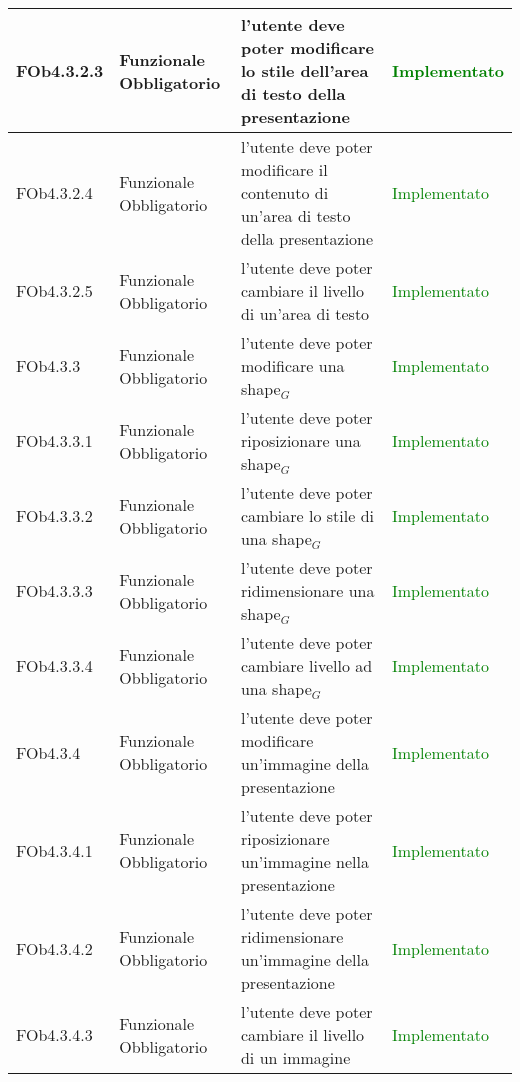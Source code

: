 \begin{longtable}{|l|p{2.5cm}|p{5cm}|p{3.5cm}|}
\hline
FOb4.3.2.3 & Funzionale \linebreak Obbligatorio & l'utente deve poter modificare lo stile dell'area di testo della presentazione & \textcolor{green}{Implementato}  \\
\hline
FOb4.3.2.4 & Funzionale \linebreak Obbligatorio & l'utente deve poter modificare il contenuto di un'area di testo della presentazione & \textcolor{green}{Implementato}  \\
\hline
FOb4.3.2.5 & Funzionale \linebreak Obbligatorio & l'utente deve poter cambiare il livello di un'area di testo & \textcolor{green}{Implementato}  \\
\hline
FOb4.3.3 & Funzionale \linebreak Obbligatorio & l'utente deve poter modificare una shape$_G$ & \textcolor{green}{Implementato}  \\
\hline
FOb4.3.3.1 & Funzionale \linebreak Obbligatorio & l'utente deve poter riposizionare una shape$_G$ & \textcolor{green}{Implementato}  \\
\hline
FOb4.3.3.2 & Funzionale \linebreak Obbligatorio & l'utente deve poter cambiare lo stile di una shape$_G$ & \textcolor{green}{Implementato}  \\
\hline
FOb4.3.3.3 & Funzionale \linebreak Obbligatorio & l'utente deve poter ridimensionare una shape$_G$ & \textcolor{green}{Implementato}  \\
\hline
FOb4.3.3.4 & Funzionale \linebreak Obbligatorio & l'utente deve poter cambiare livello ad una shape$_G$ & \textcolor{green}{Implementato}  \\
\hline
FOb4.3.4 & Funzionale \linebreak Obbligatorio & l'utente deve poter modificare un'immagine della presentazione & \textcolor{green}{Implementato}  \\
\hline
FOb4.3.4.1 & Funzionale \linebreak Obbligatorio & l'utente deve poter riposizionare un'immagine nella presentazione & \textcolor{green}{Implementato}  \\
\hline
FOb4.3.4.2 & Funzionale \linebreak Obbligatorio & l'utente deve poter ridimensionare un'immagine della presentazione & \textcolor{green}{Implementato}  \\
\hline
FOb4.3.4.3 & Funzionale \linebreak Obbligatorio & l'utente deve poter cambiare il livello di un immagine & \textcolor{green}{Implementato}  \\

\end{longtable}
